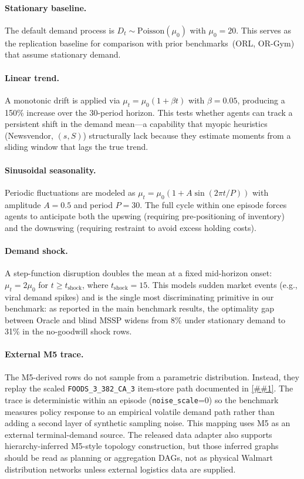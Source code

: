 \documentclass[10pt,a4paper]{article}
\providecommand{\Cref}[1]{\ref{##1}}
\begin{document}
\paragraph{Stationary baseline.}
The default demand process is $D_t \sim \text{Poisson}(\mu_0)$ with
$\mu_0 = 20$. This serves as the replication baseline for comparison
with prior benchmarks~(ORL, OR-Gym) that assume stationary demand.

\paragraph{Linear trend.}
A monotonic drift is applied via $\mu_t = \mu_0 (1 + \beta t)$ with
$\beta = 0.05$, producing a 150\% increase over the 30-period horizon.
This tests whether agents can track a persistent shift in the demand
mean---a capability that myopic heuristics (Newsvendor, $(s,S)$)
structurally lack because they estimate moments from a sliding window
that lags the true trend.

\paragraph{Sinusoidal seasonality.}
Periodic fluctuations are modeled as
$\mu_t = \mu_0 (1 + A \sin(2\pi t / P))$ with amplitude $A = 0.5$
and period $P = 30$. The full cycle within one episode forces agents
to anticipate both the upswing (requiring pre-positioning of inventory)
and the downswing (requiring restraint to avoid excess holding costs).

\paragraph{Demand shock.}
A step-function disruption doubles the mean at a fixed mid-horizon onset:
$\mu_t = 2\mu_0$ for $t \geq t_{\text{shock}}$, where $t_{\text{shock}} = 15$.
This models sudden market events (e.g., viral demand spikes)
and is the single most discriminating primitive in our benchmark:
as reported in the main benchmark results, the optimality gap between Oracle
and blind MSSP widens from 8\% under stationary demand to 31\% in
the no-goodwill shock rows.

\paragraph{External M5 trace.}
The M5-derived rows do not sample from a parametric distribution.
Instead, they replay the scaled \texttt{FOODS\_3\_382\_CA\_3}
item-store path documented in \Cref{app:scenarios}. The trace is
deterministic within an episode (\texttt{noise\_scale}=0) so the
benchmark measures policy response to an empirical volatile demand path
rather than adding a second layer of synthetic sampling noise. This
mapping uses M5 as an external terminal-demand source. The released data
adapter also supports hierarchy-inferred M5-style topology construction,
but those inferred graphs should be read as planning or aggregation DAGs,
not as physical Walmart distribution networks unless external logistics
data are supplied.
\end{document}
